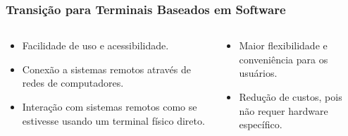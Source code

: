 \documentclass{beamer}
\begin{document}
      \begin{frame}
            \frametitle{Transição para Terminais Baseados em Software}
            
            \begin{columns}
            \begin{column}{0.6\textwidth}
            
            \begin{itemize}
                \item Facilidade de uso e acessibilidade.
                \item Conexão a sistemas remotos através de redes de computadores.
                \item Interação com sistemas remotos como se estivesse usando um terminal físico direto.
              
            \end{itemize}
            \end{column}
            
            \begin{column}{0.4\textwidth}
                \begin{itemize}
                    \item Maior flexibilidade e conveniência para os usuários.
                    \item Redução de custos, pois não requer hardware específico.
                \end{itemize}
            \end{column}
            \end{columns}
            \end{frame}
\end{document}
